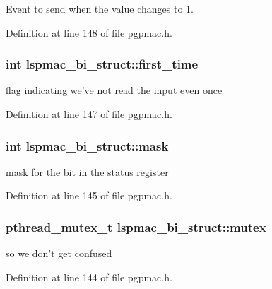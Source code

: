 Event to send when the value changes to 1. 



Definition at line 148 of file pgpmac.\-h.

\hypertarget{structlspmac__bi__struct_a814978c33dc99e7911faa4ddb12bfd90}{
\subsubsection[{first\-\_\-time}]{\setlength{\rightskip}{0pt plus 5cm}int lspmac\-\_\-bi\-\_\-struct\-::first\-\_\-time}}\label{structlspmac__bi__struct_a814978c33dc99e7911faa4ddb12bfd90}


flag indicating we've not read the input even once 



Definition at line 147 of file pgpmac.\-h.

\hypertarget{structlspmac__bi__struct_ac010058c9883088705059dee1d90ee72}{
\subsubsection[{mask}]{\setlength{\rightskip}{0pt plus 5cm}int lspmac\-\_\-bi\-\_\-struct\-::mask}}\label{structlspmac__bi__struct_ac010058c9883088705059dee1d90ee72}


mask for the bit in the status register 



Definition at line 145 of file pgpmac.\-h.

\hypertarget{structlspmac__bi__struct_a58053a98fa4696b56d674e775b3b4690}{
\subsubsection[{mutex}]{\setlength{\rightskip}{0pt plus 5cm}pthread\-\_\-mutex\-\_\-t lspmac\-\_\-bi\-\_\-struct\-::mutex}}\label{structlspmac__bi__struct_a58053a98fa4696b56d674e775b3b4690}


so we don't get confused 



Definition at line 144 of file pgpmac.\-h.

